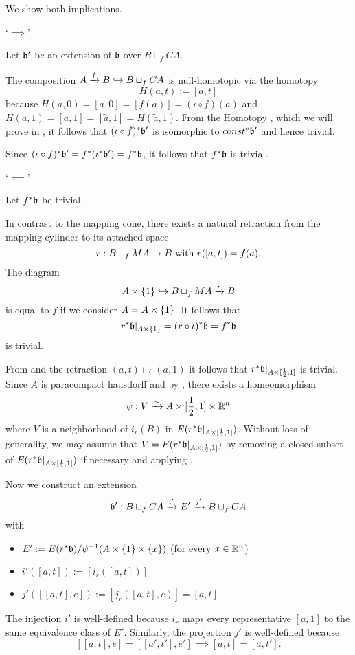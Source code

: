 \begin{myproof}
    We show both implications.

    `$\implies$'

    Let $\bb'$ be an extension of $\bb$ over $B \sqcup_f CA$.

    The composition $A \xrightarrow{f} B \hookrightarrow{} B \sqcup_f CA$ is
    null-homotopic via the homotopy
    \[ H(a, t) := [a, t] \]
    because $H(a, 0) = [a, 0] = [f(a)] = (\iota \circ f)(a)$
     and $H(a, 1) = [a, 1] = [\tilde{a}, 1] = H(\tilde{a}, 1)$.
    From the Homotopy ,
    which we will prove in ,
    it follows that $\ind{(\iota \circ f)}\bb'$ is
    isomorphic to $\ind{const}\bb'$ and hence trivial.

    Since $\ind{(\iota \circ f)}\bb' = \ind{f}(\ind{\iota}\bb') = \ind{f}\bb$,
    it follows that $\ind{f}\bb$ is trivial.

    `$\impliedby$'

    Let $\ind{f}\bb$ be trivial.

    In contrast to the mapping cone,
    there exists a natural retraction from the mapping cylinder to its attached space
    \[ r: B \sqcup_f MA \to B \text{ with } r([a, t]) = f(a). \]
    The diagram
    \[ A \times \{1\} \hookrightarrow{} B \sqcup_f MA \xrightarrow{r} B \]
    is equal to $f$ if we consider $A = A \times{} \{1\}$.
    It follows that
    \[ \ind{r}\bb[A \cross \{1\}] = \ind{(r \circ \iota)}\bb = \ind{f}\bb \]
    is trivial.

    From  and the retraction $(a, t) \mapsto (a, 1)$
    it follows that $\ind{r}\bb[A \cross [\half, 1]]$ is trivial.
    Since $A$ is paracompact hausdorff and by ,
    there exists a homeomorphism
    \[ \psi: V \xrightarrow{\sim} A \times [\frac{1}{2}, 1] \times \mathbb{R}^n \]
    where $V$ is a neighborhood of $i_r(B)$ in $E(\ind{r}\bb[A \cross [\half, 1]])$.
    Without loss of generality,
    we may assume that $V = E(\ind{r}\bb[A \cross [\half, 1]])$
    by removing a closed subset of $E(\ind{r}\bb[A \cross [\half, 1]])$
    if necessary and applying .

    Now we construct an extension
    \[ \bundledef{\bb'}{B \sqcup_f CA}{E'}{i'}{j'} \]
    with
    \begin{itemize}
        \item $E' := E(\ind{r}\bb) / \inv{\psi}(A \cross \{1\} \cross \{x\})$ (for every $x \in \mathbb{R}^n$)
        \item $i'([a, t]) := [i_r([a, t])]$
        \item $j'([[a, t], e]) := [j_r([a, t], e)] = [a, t]$
    \end{itemize}
    The injection $i'$ is well-defined because $i_r$ maps every
    representative $[a, 1]$ to the same equivalence class of $E'$.
    Similarly, the projection $j'$ is well-defined because
    \[ [[a, t], e] = [[a', t'], e'] \implies  [a, t] = [a, t']. \]


\end{myproof}
